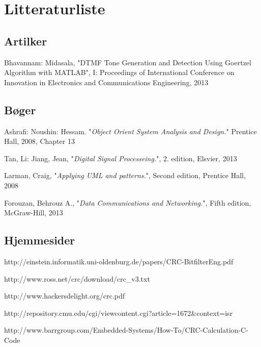 \section{Litteraturliste}
\begingroup
\renewcommand{\section}[2]{}%

\begin{thebibliography}{1}
	\subsection{Artilker}
	  Bhavannam: Midasala, "DTMF Tone Generation and Detection Using Goertzel Algorithm with MATLAB", I: Proceedings of International Conference on Innovation in Electronics and Communications Engineering, 2013
	
	\subsection{Bøger}
  
   Ashrafi: Noushin: Hessam. "{\em Object Orient System Analysis and Design.}" Prentice Hall, 2008, Chapter 13
  
   Tan, Li: Jiang, Jean, "{\em Digital Signal Processeing.}", 2. edition, Elsvier, 2013
  
   Larman, Craig, "{\em Applying UML and patterns.}", Second edition, Prentice Hall, 2008
    
   Forouzan, Behrouz A., "{\em Data Communications and Networking.}", Fifth edition, McGraw-Hill, 2013
  
	\subsection{Hjemmesider}
   {http://einstein.informatik.uni-oldenburg.de/papers/CRC-BitfilterEng.pdf}

   {http://www.ross.net/crc/download/crc\_v3.txt}
  
   {http://www.hackersdelight.org/crc.pdf}
  
  {http://repository.cmu.edu/cgi/viewcontent.cgi?article=1672\&context=isr}
  
  {http://www.barrgroup.com/Embedded-Systems/How-To/CRC-Calculation-C-Code}
  \end{thebibliography}